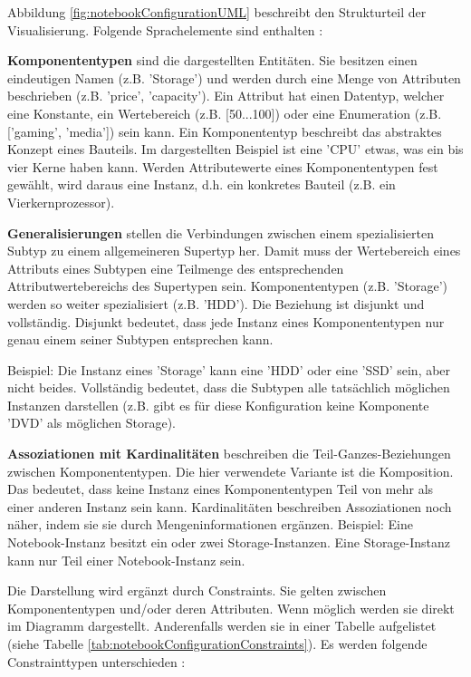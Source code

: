\documentclass[11pt, a4paper, titlepage, listof=totoc, bibliography=totoc, index=totoc, twoside, openright, headings=normal]{scrreprt}
\begin{document}
Abbildung \ref{fig:notebookConfigurationUML} beschreibt den Strukturteil der Visualisierung. Folgende Sprachelemente sind enthalten \citep{felferning14}:
\begin{compactitem}
\item\textbf{Komponententypen} sind die dargestellten Entitäten. Sie besitzen einen eindeutigen Namen (z.B. 'Storage') und werden durch eine Menge von Attributen beschrieben (z.B. 'price', 'capacity'). Ein Attribut hat einen Datentyp, welcher eine Konstante, ein Wertebereich (z.B. [50...100]) oder eine Enumeration (z.B. ['gaming', 'media']) sein kann. Ein Komponententyp beschreibt das abstraktes Konzept eines Bauteils. Im dargestellten Beispiel ist eine 'CPU' etwas, was ein bis vier Kerne haben kann. Werden Attributewerte eines Komponententypen fest gewählt, wird daraus eine Instanz, d.h. ein konkretes Bauteil (z.B. ein Vierkernprozessor).
\item \textbf{Generalisierungen} stellen die Verbindungen zwischen einem spezialisierten Subtyp zu einem allgemeineren Supertyp her. Damit muss der Wertebereich eines Attributs eines Subtypen eine Teilmenge des entsprechenden Attributwertebereichs des Supertypen sein. Komponententypen (z.B. 'Storage') werden so weiter spezialisiert (z.B. 'HDD'). Die Beziehung ist disjunkt und vollständig. Disjunkt bedeutet, dass jede Instanz eines Komponententypen nur genau einem seiner Subtypen entsprechen kann.\vspace{0.3em}

Beispiel: Die Instanz eines 'Storage' kann eine 'HDD' oder eine 'SSD' sein, aber nicht beides. Vollständig bedeutet, dass die Subtypen alle tatsächlich möglichen Instanzen darstellen (z.B. gibt es für diese Konfiguration keine Komponente 'DVD' als möglichen Storage).
\item \textbf{Assoziationen mit Kardinalitäten} beschreiben die Teil-Ganzes-Beziehungen zwischen Komponententypen. Die hier verwendete Variante ist die Komposition. Das bedeutet, dass keine Instanz eines Komponententypen Teil von mehr als einer anderen Instanz sein kann. Kardinalitäten beschreiben Assoziationen noch näher, indem sie sie durch Mengeninformationen ergänzen. Beispiel: Eine Notebook-Instanz besitzt ein oder zwei Storage-Instanzen. Eine Storage-Instanz kann nur Teil einer Notebook-Instanz sein.
\end{compactitem}

Die Darstellung wird ergänzt durch Constraints. Sie gelten zwischen Komponententypen und/oder deren Attributen. Wenn möglich werden sie direkt im Diagramm dargestellt. Anderenfalls werden sie in einer Tabelle aufgelistet (siehe Tabelle \ref{tab:notebookConfigurationConstraints}). Es werden folgende Constrainttypen unterschieden \citep{felferning14}:
\end{document}

